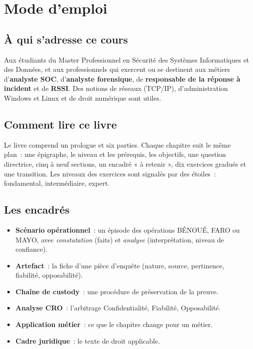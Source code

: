 
\chapter*{Mode d'emploi}

\section*{À qui s'adresse ce cours}

Aux étudiants du Master Professionnel en Sécurité des Systèmes Informatiques
et des Données, et aux professionnels qui exercent ou se destinent aux
métiers d'\textbf{analyste SOC}, d'\textbf{analyste forensique}, de
\textbf{responsable de la réponse à incident} et de \textbf{RSSI}. Des
notions de réseaux (TCP/IP), d'administration Windows et Linux et de droit
numérique sont utiles.

\section*{Comment lire ce livre}

Le livre comprend un prologue et six parties. Chaque chapitre suit le même
plan~: une épigraphe, le niveau et les prérequis, les objectifs, une question
directrice, cinq à neuf sections, un encadré « à retenir », dix exercices
gradués et une transition. Les niveaux des exercices sont signalés par des
étoiles~: \niveaubase{} fondamental, \niveaumoyen{} intermédiaire,
\niveauexpert{} expert.

\section*{Les encadrés}

\begin{itemize}
    \item \textbf{Scénario opérationnel}~: un épisode des opérations BÉNOUÉ,
          FARO ou MAYO, avec \emph{constatation} (faits) et \emph{analyse}
          (interprétation, niveau de confiance).
    \item \textbf{Artefact}~: la fiche d'une pièce d'enquête (nature, source,
          pertinence, fiabilité, opposabilité).
    \item \textbf{Chaîne de custody}~: une procédure de préservation de la
          preuve.
    \item \textbf{Analyse CRO}~: l'arbitrage Confidentialité, Fiabilité,
          Opposabilité.
    \item \textbf{Application métier}~: ce que le chapitre change pour un
          métier.
    \item \textbf{Cadre juridique}~: le texte de droit applicable.
\end{itemize}

